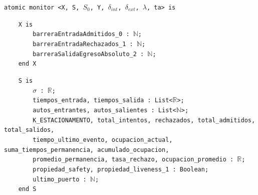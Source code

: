 \documentclass[12pt]{article}
\begin{document}
\begin{tcolorbox}[
    colback=black!5!white,
    colframe=black!80!white,
    boxrule=0.8pt,
    arc=2pt,
    left=5pt,
    right=5pt,
    top=5pt,
    bottom=5pt,
    fontupper=\ttfamily,
    breakable
]
\begin{flushleft}
\texttt{atomic monitor <X, S, $S_0$, Y, }$\delta_{int}$\texttt{, }$\delta_{ext}$\texttt{, }$\lambda$\texttt{, ta> is}
\end{flushleft}

\begin{flushleft}
\texttt{~~~~X is} \\
\texttt{~~~~~~~~barreraEntradaAdmitidos\_0 : }\(\mathbb{N}\)\texttt{;} \\
\texttt{~~~~~~~~barreraEntradaRechazados\_1 : }\(\mathbb{N}\)\texttt{;} \\
\texttt{~~~~~~~~barreraSalidaEgresoAbsoluto\_2 : }\(\mathbb{N}\)\texttt{;} \\
\texttt{~~~~end X}
\end{flushleft}

\begin{flushleft}
\texttt{~~~~S is} \\
\texttt{~~~~~~~~}$\sigma$\texttt{ : }\(\mathbb{R}\)\texttt{;} \\
\texttt{~~~~~~~~tiempos\_entrada, tiempos\_salida : List<}\(\mathbb{R}\)\texttt{>;} \\
\texttt{~~~~~~~~autos\_entrantes, autos\_salientes : List<}\(\mathbb{N}\)\texttt{>;} \\
\texttt{~~~~~~~~K\_ESTACIONAMENTO, total\_intentos, rechazados, total\_admitidos, total\_salidos,} \\
\texttt{~~~~~~~~tiempo\_ultimo\_evento, ocupacion\_actual, suma\_tiempos\_permanencia, acumulado\_ocupacion,} \\
\texttt{~~~~~~~~promedio\_permanencia, tasa\_rechazo, ocupacion\_promedio : }\(\mathbb{R}\)\texttt{;} \\
\texttt{~~~~~~~~propiedad\_safety, propiedad\_liveness\_1 : Boolean;} \\
\texttt{~~~~~~~~ultimo\_puerto : }\(\mathbb{N}\)\texttt{;} \\
\texttt{~~~~end S}
\end{flushleft}


\end{tcolorbox}
\end{document}
